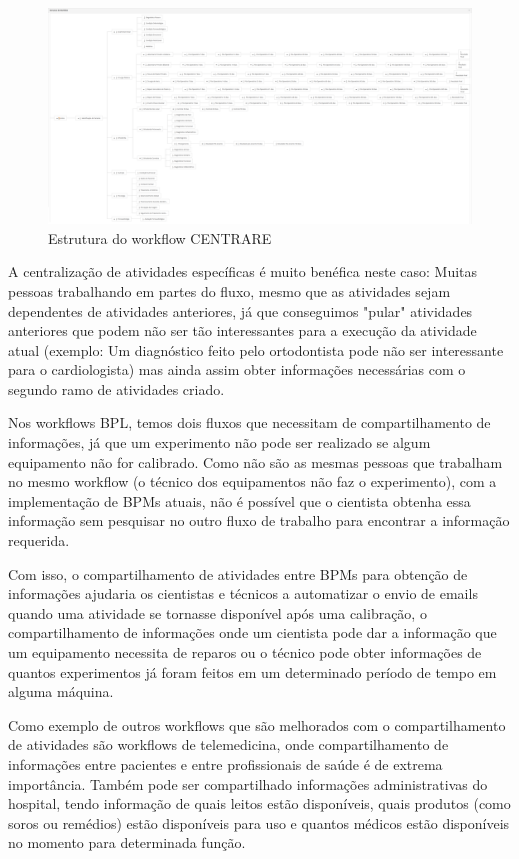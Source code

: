 \begin{figure}
    \centering
    \includegraphics[width=1\textwidth]{imgs/CENTRARE/estrutura.png}
    \caption{Estrutura do workflow CENTRARE}
    \label{fig:centrareEstrutura}
\end{figure}

A centralização de atividades específicas é muito benéfica neste caso: Muitas pessoas trabalhando em partes do fluxo, mesmo que as atividades sejam dependentes de atividades anteriores, já que conseguimos "pular" atividades anteriores que podem não ser tão interessantes para a execução da atividade atual (exemplo: Um diagnóstico feito pelo ortodontista pode não ser interessante para o cardiologista) mas ainda assim obter informações necessárias com o segundo ramo de atividades criado.

Nos workflows BPL, temos dois fluxos que necessitam de compartilhamento de informações, já que um experimento não pode ser realizado se algum equipamento não for calibrado. Como não são as mesmas pessoas que trabalham no mesmo workflow (o técnico dos equipamentos não faz o experimento), com a implementação de BPMs atuais, não é possível que o cientista obtenha essa informação sem pesquisar no outro fluxo de trabalho para encontrar a informação requerida.

Com isso, o compartilhamento de atividades entre BPMs para obtenção de informações ajudaria os cientistas e técnicos a automatizar o envio de emails quando uma atividade se tornasse disponível após uma calibração, o compartilhamento de informações onde um cientista pode dar a informação que um equipamento necessita de reparos ou o técnico pode obter informações de quantos experimentos já foram feitos em um determinado período de tempo em alguma máquina.

Como exemplo de outros workflows que são melhorados com o compartilhamento de atividades são workflows de telemedicina, onde compartilhamento de informações entre pacientes e entre profissionais de saúde é de extrema importância. Também pode ser compartilhado informações administrativas do hospital, tendo informação de quais leitos estão disponíveis, quais produtos (como soros ou remédios) estão disponíveis para uso e quantos médicos estão disponíveis no momento para determinada função.

